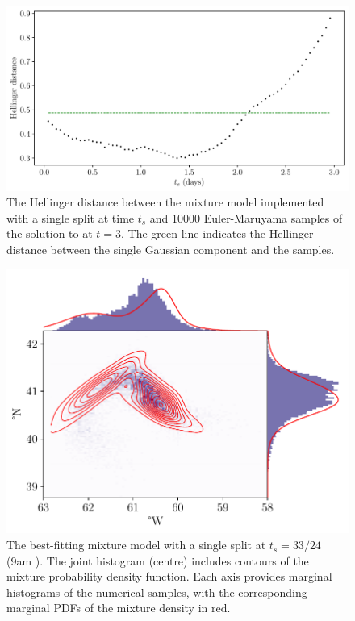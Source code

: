 \begin{figure}
	\centering
	\includegraphics[width=\textwidth]{chp06_applications/figures/gulf_stream/hell_dist_split}
	\caption{The Hellinger distance between the mixture model implemented with a single split at time \(t_s\) and 10000 Euler-Maruyama samples of the solution to  at \(t = 3\).
		The green line indicates the Hellinger distance between the single Gaussian component and the samples.}
	\label{fig:na_1split_hell}
\end{figure}

\begin{figure}
	\centering
	\includegraphics[width=\textwidth]{chp06_applications/figures/gulf_stream/gmm_split_best}
	\caption{The best-fitting mixture model with a single split at \(t_s = 33/24\) (9am ).
		The joint histogram (centre) includes contours of the mixture probability density function.
		Each axis provides marginal histograms of the numerical samples, with the corresponding marginal PDFs of the mixture density in red.}
	\label{fig:na_1split_best}
\end{figure}

